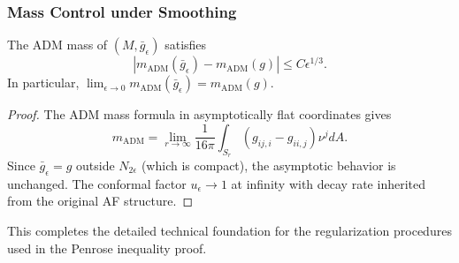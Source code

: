 \subsubsection{Mass Control under Smoothing}

\begin{proposition}
\label{prop:MassPreservation}
The ADM mass of $(M, \bar{g}_\epsilon)$ satisfies
\[
|m_{\mathrm{ADM}}(\bar{g}_\epsilon) - m_{\mathrm{ADM}}(g)| \le C \epsilon^{1/3}.
\]
In particular, $\lim_{\epsilon \to 0} m_{\mathrm{ADM}}(\bar{g}_\epsilon) = m_{\mathrm{ADM}}(g)$.
\end{proposition}

\begin{proof}
The ADM mass formula in asymptotically flat coordinates gives
\[
m_{\mathrm{ADM}} = \lim_{r \to \infty} \frac{1}{16\pi} \int_{S_r} (g_{ij,i} - g_{ii,j}) \nu^j dA.
\]
Since $\bar{g}_\epsilon = g$ outside $N_{2\epsilon}$ (which is compact), the asymptotic behavior is unchanged. The conformal factor $u_\epsilon \to 1$ at infinity with decay rate inherited from the original AF structure.
\end{proof}

This completes the detailed technical foundation for the regularization procedures used in the Penrose inequality proof.
